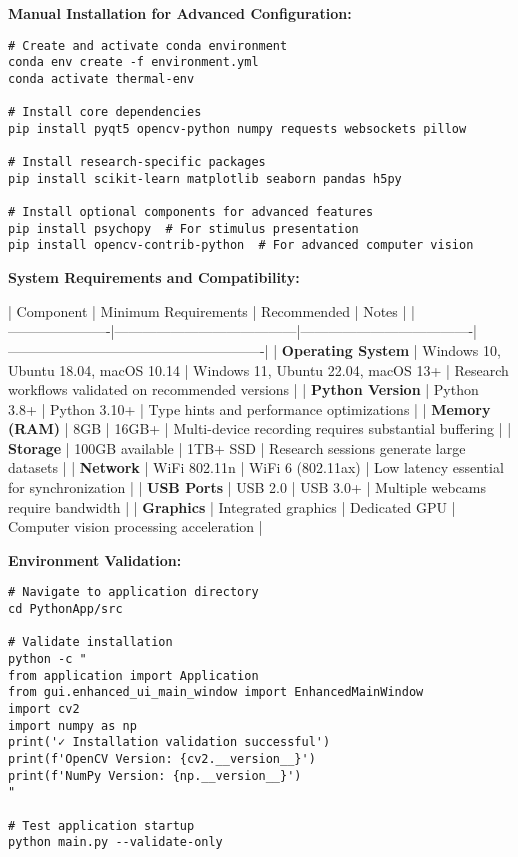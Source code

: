 \documentclass[11pt,a4paper]{article}
\begin{document}
\textbf{Manual Installation for Advanced Configuration:}

\begin{verbatim}
# Create and activate conda environment
conda env create -f environment.yml
conda activate thermal-env

# Install core dependencies
pip install pyqt5 opencv-python numpy requests websockets pillow

# Install research-specific packages
pip install scikit-learn matplotlib seaborn pandas h5py

# Install optional components for advanced features
pip install psychopy  # For stimulus presentation
pip install opencv-contrib-python  # For advanced computer vision
\end{verbatim}

\textbf{System Requirements and Compatibility:}

| Component            | Minimum Requirements                  | Recommended                         | Notes                                                 |
|----------------------|---------------------------------------|-------------------------------------|-------------------------------------------------------|
| \textbf{Operating System} | Windows 10, Ubuntu 18.04, macOS 10.14 | Windows 11, Ubuntu 22.04, macOS 13+ | Research workflows validated on recommended versions  |
| \textbf{Python Version}   | Python 3.8+                           | Python 3.10+                        | Type hints and performance optimizations              |
| \textbf{Memory (RAM)}     | 8GB                                   | 16GB+                               | Multi-device recording requires substantial buffering |
| \textbf{Storage}          | 100GB available                       | 1TB+ SSD                            | Research sessions generate large datasets             |
| \textbf{Network}          | WiFi 802.11n                          | WiFi 6 (802.11ax)                   | Low latency essential for synchronization             |
| \textbf{USB Ports}        | USB 2.0                               | USB 3.0+                            | Multiple webcams require bandwidth                    |
| \textbf{Graphics}         | Integrated graphics                   | Dedicated GPU                       | Computer vision processing acceleration               |

\textbf{Environment Validation:}

\begin{verbatim}
# Navigate to application directory
cd PythonApp/src

# Validate installation
python -c "
from application import Application
from gui.enhanced_ui_main_window import EnhancedMainWindow
import cv2
import numpy as np
print('✓ Installation validation successful')
print(f'OpenCV Version: {cv2.__version__}')
print(f'NumPy Version: {np.__version__}')
"

# Test application startup
python main.py --validate-only
\end{verbatim}
\end{document}

